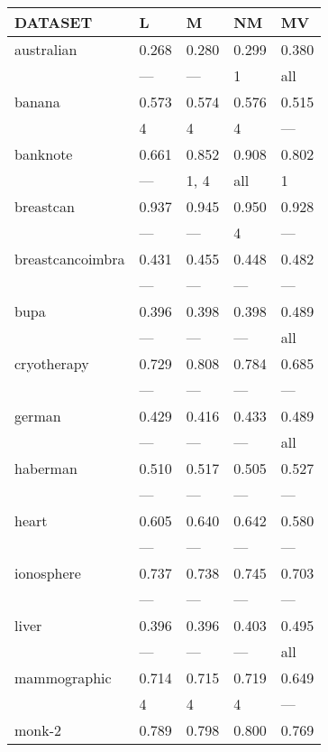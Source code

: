 \begin{tabular}{lllll}
\toprule
 DATASET          & L     & M     & NM    & MV    \\
\midrule
 australian       & 0.268 & 0.280 & 0.299 & 0.380 \\
                  & ---   & ---   & 1     & all   \\
 banana           & 0.573 & 0.574 & 0.576 & 0.515 \\
                  & 4     & 4     & 4     & ---   \\
 banknote         & 0.661 & 0.852 & 0.908 & 0.802 \\
                  & ---   & 1, 4  & all   & 1     \\
 breastcan        & 0.937 & 0.945 & 0.950 & 0.928 \\
                  & ---   & ---   & 4     & ---   \\
 breastcancoimbra & 0.431 & 0.455 & 0.448 & 0.482 \\
                  & ---   & ---   & ---   & ---   \\
 bupa             & 0.396 & 0.398 & 0.398 & 0.489 \\
                  & ---   & ---   & ---   & all   \\
 cryotherapy      & 0.729 & 0.808 & 0.784 & 0.685 \\
                  & ---   & ---   & ---   & ---   \\
 german           & 0.429 & 0.416 & 0.433 & 0.489 \\
                  & ---   & ---   & ---   & all   \\
 haberman         & 0.510 & 0.517 & 0.505 & 0.527 \\
                  & ---   & ---   & ---   & ---   \\
 heart            & 0.605 & 0.640 & 0.642 & 0.580 \\
                  & ---   & ---   & ---   & ---   \\
 ionosphere       & 0.737 & 0.738 & 0.745 & 0.703 \\
                  & ---   & ---   & ---   & ---   \\
 liver            & 0.396 & 0.396 & 0.403 & 0.495 \\
                  & ---   & ---   & ---   & all   \\
 mammographic     & 0.714 & 0.715 & 0.719 & 0.649 \\
                  & 4     & 4     & 4     & ---   \\
 monk-2           & 0.789 & 0.798 & 0.800 & 0.769 \\

\end{tabular}
